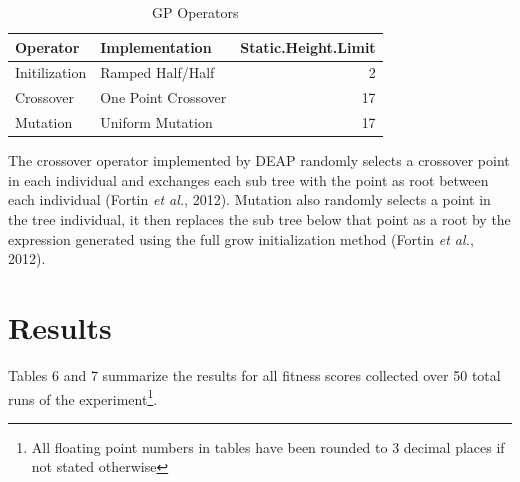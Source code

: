\documentclass[
  12pt,
]{article}
\begin{document}
\begin{table}[!h]

\caption{\label{tab:unnamed-chunk-5}GP Operators}
\centering
\begin{tabular}[t]{l|l|r}
\hline
\textbf{Operator} & \textbf{Implementation} & \textbf{Static.Height.Limit}\\
\hline
Initilization & Ramped Half/Half & 2\\
\hline
Crossover & One Point Crossover & 17\\
\hline
Mutation & Uniform Mutation & 17\\
\hline
\end{tabular}
\end{table}

The crossover operator implemented by DEAP randomly selects a crossover
point in each individual and exchanges each sub tree with the point as
root between each individual (Fortin \emph{et al.}, 2012). Mutation also
randomly selects a point in the tree individual, it then replaces the
sub tree below that point as a root by the expression generated using
the full grow initialization method (Fortin \emph{et al.}, 2012).

\hypertarget{results}{%
\section{Results}\label{results}}

Tables 6 and 7 summarize the results for all fitness scores collected
over 50 total runs of the experiment\footnote{All floating point numbers
  in tables have been rounded to 3 decimal places if not stated
  otherwise}.
\end{document}
